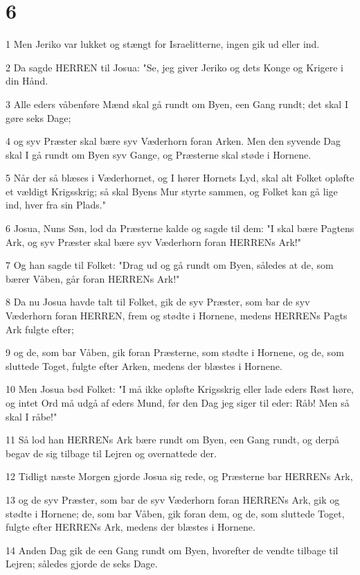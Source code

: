 \chapter{6}

\par 1 Men Jeriko var lukket og stængt for Israelitterne, ingen gik ud eller ind.
\par 2 Da sagde HERREN til Josua: "Se, jeg giver Jeriko og dets Konge og Krigere i din Hånd.
\par 3 Alle eders våbenføre Mænd skal gå rundt om Byen, een Gang rundt; det skal I gøre seks Dage;
\par 4 og syv Præster skal bære syv Væderhorn foran Arken. Men den syvende Dag skal I gå rundt om Byen syv Gange, og Præsterne skal støde i Hornene.
\par 5 Når der så blæses i Væderhornet, og I hører Hornets Lyd, skal alt Folket opløfte et vældigt Krigsskrig; så skal Byens Mur styrte sammen, og Folket kan gå lige ind, hver fra sin Plads."
\par 6 Josua, Nuns Søn, lod da Præsterne kalde og sagde til dem: "I skal bære Pagtens Ark, og syv Præster skal bære syv Væderhorn foran HERRENs Ark!"
\par 7 Og han sagde til Folket: "Drag ud og gå rundt om Byen, således at de, som bærer Våben, går foran HERRENs Ark!"
\par 8 Da nu Josua havde talt til Folket, gik de syv Præster, som bar de syv Væderhorn foran HERREN, frem og stødte i Hornene, medens HERRENs Pagts Ark fulgte efter;
\par 9 og de, som bar Våben, gik foran Præsterne, som stødte i Hornene, og de, som sluttede Toget, fulgte efter Arken, medens der blæstes i Hornene.
\par 10 Men Josua bød Folket: "I må ikke opløfte Krigsskrig eller lade eders Røst høre, og intet Ord må udgå af eders Mund, før den Dag jeg siger til eder: Råb! Men så skal I råbe!"
\par 11 Så lod han HERRENs Ark bære rundt om Byen, een Gang rundt, og derpå begav de sig tilbage til Lejren og overnattede der.
\par 12 Tidligt næste Morgen gjorde Josua sig rede, og Præsterne bar HERRENs Ark,
\par 13 og de syv Præster, som bar de syv Væderhorn foran HERRENs Ark, gik og stødte i Hornene; de, som bar Våben, gik foran dem, og de, som sluttede Toget, fulgte efter HERRENs Ark, medens der blæstes i Hornene.
\par 14 Anden Dag gik de een Gang rundt om Byen, hvorefter de vendte tilbage til Lejren; således gjorde de seks Dage.
